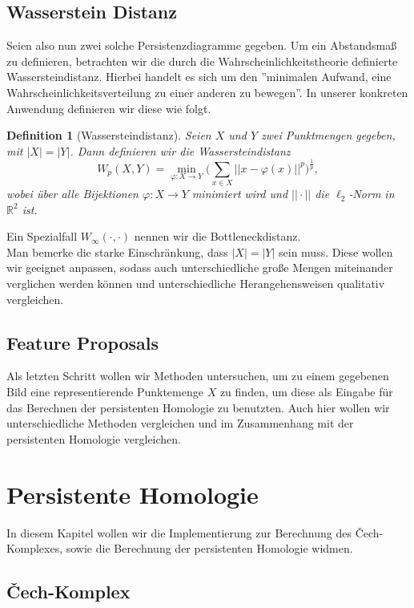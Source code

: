 \documentclass[11pt, a4paper,draft]{report}
\newtheorem{definition}{Definition}
\newcommand{\bR}{\mathbb{R}}
\begin{document}
	\section{Wasserstein Distanz}
	
	Seien also nun zwei solche Persistenzdiagramme gegeben. Um ein Abstandsmaß zu definieren, betrachten wir die durch die Wahrscheinlichkeitstheorie definierte Wassersteindistanz. Hierbei handelt es sich um den ''minimalen Aufwand, eine Wahrscheinlichkeitsverteilung zu einer anderen zu bewegen''. In unserer konkreten Anwendung definieren wir diese wie folgt.
	
	\begin{definition}[Wassersteindistanz]
		Seien $X$ und $Y$ zwei Punktmengen gegeben, mit $|X|=|Y|$. Dann definieren wir die Wassersteindistanz
		$$W_p(X,Y) = \min_{\varphi:X\rightarrow Y}\bigg(\sum_{x\in X}||x-\varphi(x)||^p\bigg)^{\frac{1}{p}},$$
		wobei über alle Bijektionen $\varphi:X\rightarrow Y$ minimiert wird und $||\cdot||$ die $\ell_2$-Norm in $\bR^2$ ist.
	\end{definition}

	Ein Spezialfall $W_\infty(\cdot,\cdot)$ nennen wir die Bottleneckdistanz.\\
	Man bemerke die starke Einschränkung, dass $|X| = |Y|$ sein muss. Diese wollen wir geeignet anpassen, sodass auch unterschiedliche große Mengen miteinander verglichen werden können und unterschiedliche Herangehensweisen qualitativ vergleichen.
	
	\section{Feature Proposals}
	
	Als letzten Schritt wollen wir Methoden untersuchen, um zu einem gegebenen Bild eine representierende Punktemenge $X$ zu finden, um diese als Eingabe für das Berechnen der persistenten Homologie zu benutzten. Auch hier wollen wir unterschiedliche Methoden vergleichen und im Zusammenhang mit der persistenten Homologie vergleichen.
	
	\chapter{Persistente Homologie}
	
	In diesem Kapitel wollen wir die Implementierung zur Berechnung des Čech-Komplexes, sowie die Berechnung der persistenten Homologie widmen.
	
	\section{Čech-Komplex}
	
\end{document}
